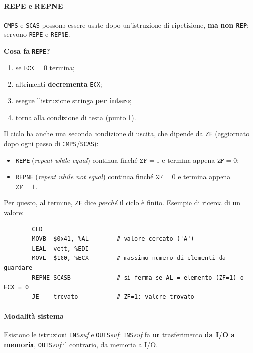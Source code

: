 \documentclass[11pt,a4paper]{article}
\begin{document}
\paragraph*{REPE e REPNE}

\texttt{CMPS} e \texttt{SCAS} possono essere usate dopo un'istruzione di ripetizione, \textbf{ma non \texttt{REP}}: servono \texttt{REPE} e \texttt{REPNE}.

\textbf{Cosa fa \texttt{REPE}?}
\begin{enumerate}[leftmargin=*]
  \item se $\texttt{ECX}=0$ termina;
  \item altrimenti \textbf{decrementa} \texttt{ECX};
  \item esegue l'istruzione stringa \textbf{per intero};
  \item torna alla condizione di testa (punto 1).
\end{enumerate}

\begin{integrazione}
Il ciclo ha anche una seconda condizione di uscita, che dipende da \texttt{ZF} (aggiornato dopo ogni passo di \texttt{CMPS}/\texttt{SCAS}):
\begin{itemize}[leftmargin=*]
  \item \texttt{REPE} (\emph{repeat while equal}) continua finché $\texttt{ZF}=1$ e termina appena $\texttt{ZF}=0$;
  \item \texttt{REPNE} (\emph{repeat while not equal}) continua finché $\texttt{ZF}=0$ e termina appena $\texttt{ZF}=1$.
\end{itemize}
Per questo, al termine, \texttt{ZF} dice \emph{perché} il ciclo è finito. Esempio di ricerca di un valore:
\begin{lstlisting}
        CLD
        MOVB  $0x41, %AL        # valore cercato ('A')
        LEAL  vett, %EDI
        MOVL  $100, %ECX        # massimo numero di elementi da guardare
        REPNE SCASB             # si ferma se AL = elemento (ZF=1) o ECX = 0
        JE    trovato           # ZF=1: valore trovato
\end{lstlisting}
\end{integrazione}

\paragraph*{Modalità sistema}

Esistono le istruzioni \texttt{INS}\emph{suf} e \texttt{OUTS}\emph{suf}: \texttt{INS}\emph{suf} fa un trasferimento \textbf{da I/O a memoria}, \texttt{OUTS}\emph{suf} il contrario, da memoria a I/O.
\end{document}

